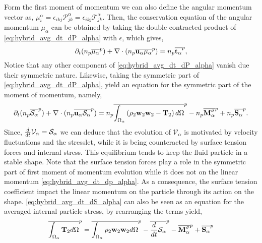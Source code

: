 Form the first moment of momentum we can also define the angular momentum vector as, $\mu^\alpha_i = \epsilon_{ikj} \mathcal{P}^\alpha_{jk} =  \epsilon_{ikj} \mathcal{T}^\alpha_{jk}$. 
Then, the conservation equation of the angular momentum $\mu_\alpha$ can be obtained by taking the double contracted product of \ref{eq:hybrid_avg_dt_dP_alpha} with $\epsilon$, which gives,
\begin{equation}
    \partial_t (n_p\overline{\mu_\alpha}^{p})
    + \mathbf{\nabla}\cdot (n_p\overline{  \textbf{u}_\alpha \mu_\alpha}^{p})
    =  
    n_p\overline{\textbf{t}_\alpha}^{p},
    \label{eq:hybrid_avg_dt_dmu_alpha}
\end{equation}
Notice that any other component of \ref{eq:hybrid_avg_dt_dP_alpha} vanish due their symmetric nature. 
Likewise, taking the symmetric part of \ref{eq:hybrid_avg_dt_dP_alpha}, yield an equation for the symmetric part of the moment of momentum, namely,
\begin{multline}    
    \partial_t (n_p\overline{\mathcal{S}_\alpha}^{p})
    + \mathbf{\nabla}\cdot (n_p\overline{  \textbf{u}_\alpha \mathcal{S}_\alpha}^{p})
    =  n_p\overline{\int_{\Omega_\alpha} \left(
        \rho_2\textbf{w}_2 \textbf{w}_2
        - \mathbf{T}_2
        \right) d\Omega}^{p}
        - n_p\overline{\textbf{M}_\alpha^\sigma}^{p}
        + n_p\overline{\textbf{S}_\alpha}^{p}.
    \label{eq:hybrid_avg_dt_dS_alpha}
\end{multline}
Since, $\frac{d}{d t} \mathcal{V}_\alpha = \mathcal{S}_\alpha$ we can deduce that the evolution of $\mathcal{V}_\alpha$ is motivated by velocity fluctuations and the stresslet, while it is being counteracted by surface tension forces and internal stress. 
This equilibrium tends to keep the fluid particle in a stable shape. 
Note that the surface tension forces play a role in the symmetric part of first moment of momentum evolution while it does not on the linear momentum \ref{eq:hybrid_avg_dt_dp_alpha}.
As a consequence, the surface tension coefficient impact the linear momentum on the particle through its action on the shape. 
\ref{eq:hybrid_avg_dt_dS_alpha} can also be seen as an equation for the averaged internal particle stress, by rearranging the terms yield, 
\begin{equation}    
    \overline{\int_{\Omega_\alpha}\mathbf{T}_2d\Omega}^{p}
    = \overline{ \int_{\Omega_\alpha} \rho_2 \textbf{w}_2 \textbf{w}_2d\Omega}^{p}
    - \overline{ \frac{d}{d t} \mathcal{S}_\alpha}^{p}
    - \overline{ \textbf{M}_\alpha^\sigma}^{p}
    + \overline{  \textbf{S}_\alpha}^{p}
    \label{eq:T_definition}
\end{equation}
